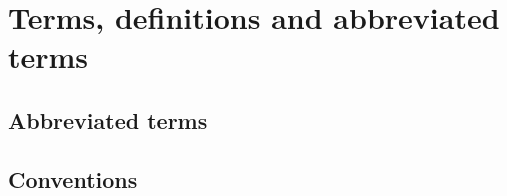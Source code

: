 \chapter{Terms, definitions and abbreviated terms}

    \section{Abbreviated terms}

    \section{Conventions}
